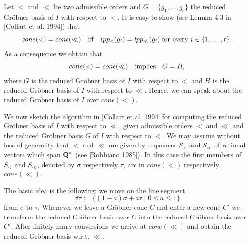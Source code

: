 \medskip
Let $<$ and $\ll$ be two admissible orders and $G=\{g_1,\ldots,g_r\}$ 
the reduced Gr\"obner basis of $I$ with respect 
to $<$. It is easy to show (see Lemma 4.3 in [Collart et al. 1994]) that
\begin{equation}
cone(<)=cone(\ll)\ \ \hbox{ iff }\ \ 
lpp_{<}(g_i)=lpp_{\ll}(g_i)
\hbox{ for every } i\in\{1,\ldots,r\}. \label{64:1}
\end{equation}
As a consequence we obtain that 
\[
cone(<)=cone(\ll)\ \ \hbox{ implies }\ \ G=H, 
\]
where $G$ is the reduced Gr\"obner basis of $I$ with respect
to $<$ and $H$ is the reduced Gr\"obner basis of $I$ with respect
to $\ll$. Hence, we can speak about the reduced Gr\"obner basis 
of $I$ over $cone(<)$.

\medskip
We now sketch the algorithm in [Collart et al. 1994]
for computing the reduced Gr\"obner basis of $I$ with respect to $\ll$,
given admissible orders $<$ and $\ll$ 
and the reduced Gr\"obner basis $G$ of $I$ with respect to $<$.
We may assume without loss of generality that $<$ and $\ll$ are given by 
sequences $S_<$ and $S_{\ll}$ of rational vectors which span ${\bf Q}^n$
(see [Robbiano 1985]). In this case the first members of $S_<$ and $S_{\ll}$, 
denoted
by $\sigma$ respectively $\tau$, are in $cone(<)$ respectively 
$cone(\ll)$.

The basic idea is the following: we move on the line segment 
\[ \overline{\sigma\tau}:=\{(1-a)\sigma +a\tau\mid 0\leq a\leq 1\} \]
from $\sigma$ to $\tau$. Whenever we leave a
Gr\"obner cone $C$ and enter a new cone $C'$ we transform the reduced
Gr\"obner basis over $C$ into the reduced Gr\"obner basis over $C'$.
After finitely many conversions we arrive at $cone(\ll)$ and obtain
the reduced Gr\"obner basis w.r.t. $\ll$.

